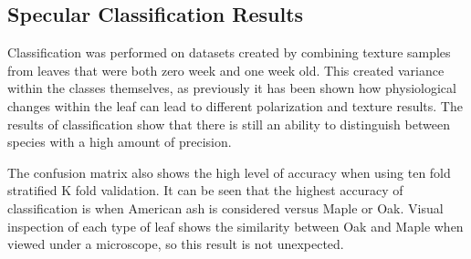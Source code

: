 \subsection{Specular Classification Results}
Classification was performed on datasets created by combining texture samples from leaves that were both zero week and one week old.  This created variance within the classes themselves, as previously it has been shown how physiological changes within the leaf can lead to different polarization and texture results.  The results of classification show that there is still an ability to distinguish between species with a high amount of precision.

The confusion matrix also shows the high level of accuracy when using ten fold stratified K fold validation.  It can be seen that the highest accuracy of classification is when American ash is considered versus Maple or Oak.  Visual inspection of each type of leaf shows the similarity between Oak and Maple when viewed under a microscope, so this result is not unexpected.

